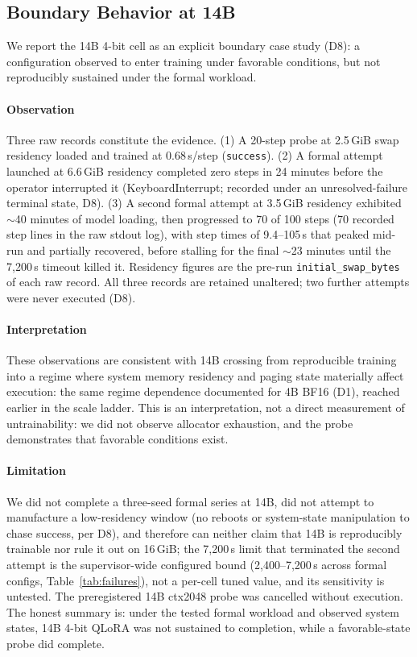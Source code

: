 \documentclass[10pt,twocolumn]{article}
\begin{document}
\subsection{Boundary Behavior at 14B}
\label{sec:boundary14b}
We report the 14B 4-bit cell as an explicit boundary case study (D8):
a configuration observed to enter training under favorable conditions,
but not reproducibly sustained under the formal workload.

\paragraph{Observation}
Three raw records constitute the evidence. (1) A 20-step probe at
2.5\,GiB swap residency loaded and trained at 0.68\,s/step
(\texttt{success}). (2) A formal attempt launched at 6.6\,GiB residency
completed zero steps in 24 minutes before the operator interrupted it
(KeyboardInterrupt; recorded under an unresolved-failure terminal
state, D8). (3) A second formal attempt at 3.5\,GiB residency exhibited
$\sim$40 minutes of model loading, then progressed to 70 of 100 steps
(70 recorded step lines in the raw stdout log), with step
times of 9.4--105\,s that peaked mid-run and partially recovered,
before stalling for the final $\sim$23 minutes until the 7{,}200\,s
timeout killed it. Residency figures are the
pre-run \texttt{initial\_swap\_bytes} of each raw record. All three
records are retained unaltered; two further attempts were never
executed (D8).

\paragraph{Interpretation}
These observations are consistent with 14B crossing from reproducible
training into a regime where system memory residency and paging state
materially affect execution: the same regime dependence documented
for 4B BF16 (D1), reached earlier in the scale ladder. This is an
interpretation, not a direct measurement of untrainability: we did not
observe allocator exhaustion, and the probe demonstrates that favorable
conditions exist.

\paragraph{Limitation}
We did not complete a three-seed formal series at 14B, did not attempt
to manufacture a low-residency window (no reboots or system-state
manipulation to chase success, per D8), and therefore can neither claim
that 14B is reproducibly trainable nor rule it out on 16\,GiB; the
7{,}200\,s limit that terminated the second attempt is the
supervisor-wide configured bound (2{,}400--7{,}200\,s across formal
configs, Table~\ref{tab:failures}), not a per-cell tuned value, and its
sensitivity is untested. The
preregistered 14B ctx2048 probe was cancelled without execution. The
honest summary is: under the tested formal workload and observed system
states, 14B 4-bit QLoRA was not sustained to completion, while a
favorable-state probe did complete.
\end{document}
